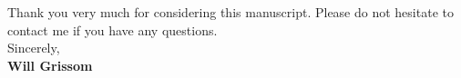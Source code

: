 \documentclass[11pt]{article}
\begin{document}
\par Thank you very much for considering this manuscript. 
Please do not hesitate to contact me if you have any questions.\\[1.5em]
% 
Sincerely,\\[1.5em] %
%
{\bfseries Will Grissom}\\
%
\vfill%
\end{document}

